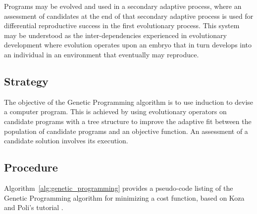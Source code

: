 Programs may be evolved and used in a secondary adaptive process, where an assessment of candidates at the end of that secondary adaptive process is used for differential reproductive success in the first evolutionary process. This system may be understood as the inter-dependencies experienced in evolutionary development where evolution operates upon an embryo that in turn develops into an individual in an environment that eventually may reproduce.

\subsection{Strategy}
The objective of the Genetic Programming algorithm is to use induction to devise a computer program. 
This is achieved by using evolutionary operators on candidate programs with a tree structure to improve the adaptive fit between the population of candidate programs and an objective function. An assessment of a candidate solution involves its execution.

\subsection{Procedure}
Algorithm~\ref{alg:genetic_programming} provides a pseudo-code listing of the Genetic Programming algorithm for minimizing a cost function, based on Koza and Poli's tutorial \cite{Koza2005}. 

